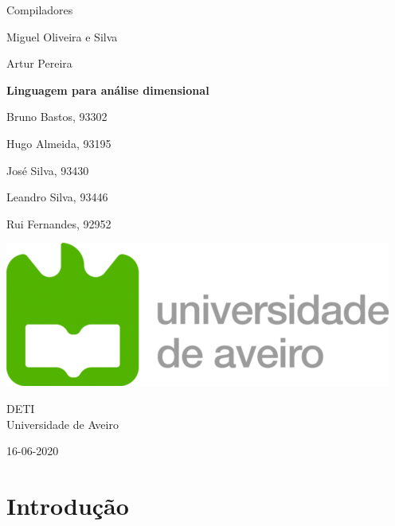 \documentclass[10pt,portuguese]{article}
\begin{document}
\begin{titlepage}
	\clearpage\thispagestyle{empty}
	\centering
	\vspace{2cm}

	
	{\Large  Compiladores \par}
	\vspace{0.5cm}
	{\small Miguel Oliveira e Silva\par
	Artur Pereira\par}
	\vspace{4cm}
	{\huge \textbf{Linguagem para análise dimensional}} \\
	\vspace{1cm}
	\vspace{4cm}
	{\normalsize  \par Bruno Bastos, 93302 \par 
	Hugo Almeida, 93195 \par
	José Silva, 93430
	\par Leandro Silva, 93446 
	   \par Rui Fernandes, 92952}
	 
	\vspace{2cm}

    \includegraphics[scale=0.20]{images/logo_ua.png}
    
    \vspace{2cm}
    
	{\normalsize DETI \\ 
		Universidade de Aveiro \par}
		
	{\normalsize 16-06-2020 \par}
	\vspace{2cm}
		
	
	\pagebreak

\end{titlepage}
\tableofcontents{}
\clearpage

\section{Introdução}
\end{document}
